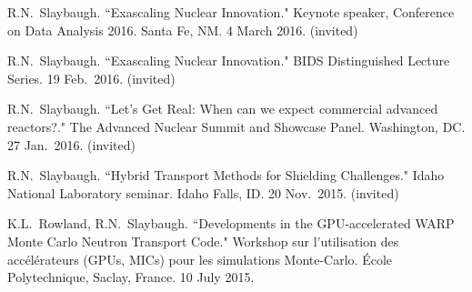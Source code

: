 \begin{bibsection}
\item R.N.\ Slaybaugh. ``Exascaling Nuclear Innovation." Keynote speaker, Conference on Data Analysis 2016. Santa Fe, NM. 4 March 2016. (invited) 

\item R.N.\ Slaybaugh. ``Exascaling Nuclear Innovation." BIDS Distinguished Lecture Series. 19 Feb.\ 2016. (invited) 

\item R.N.\ Slaybaugh. ``Let’s Get Real: When can we expect commercial
advanced reactors?." The Advanced Nuclear Summit and Showcase Panel. Washington, DC. 27 Jan.\ 2016. (invited)

\item R.N.\ Slaybaugh. ``Hybrid Transport Methods for Shielding Challenges." Idaho National Laboratory seminar. Idaho Falls, ID. 20 Nov.\ 2015. (invited) 

\item K.L.\ Rowland, R.N.\ Slaybaugh. ``Developments in the GPU-accelerated WARP Monte Carlo Neutron Transport Code." Workshop sur l'utilisation des acc\'{e}l\'{e}rateurs (GPUs, MICs) pour les simulations Monte-Carlo. \'{E}cole Polytechnique, Saclay, France. 10 July 2015. 







\end{bibsection}
